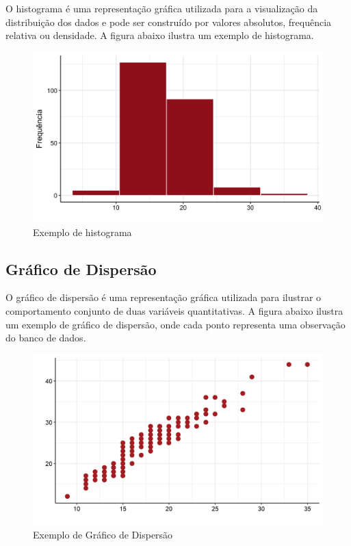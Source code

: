 \documentclass[
]{estat/estat}
\begin{document}
O histograma é uma representação gráfica utilizada para a visualização
da distribuição dos dados e pode ser construído por valores absolutos,
frequência relativa ou densidade. A figura abaixo ilustra um exemplo de
histograma.

\begin{figure}[H]

{\centering \includegraphics{images/hist_uni.png}

}

\caption{Exemplo de histograma}

\end{figure}%

\subsection{Gráfico de Dispersão}\label{gruxe1fico-de-dispersuxe3o}

O gráfico de dispersão é uma representação gráfica utilizada para
ilustrar o comportamento conjunto de duas variáveis quantitativas. A
figura abaixo ilustra um exemplo de gráfico de dispersão, onde cada
ponto representa uma observação do banco de dados.

\begin{figure}[H]

{\centering \includegraphics{images/disp_uni.png}

}

\caption{Exemplo de Gráfico de Dispersão}

\end{figure}%
\end{document}
